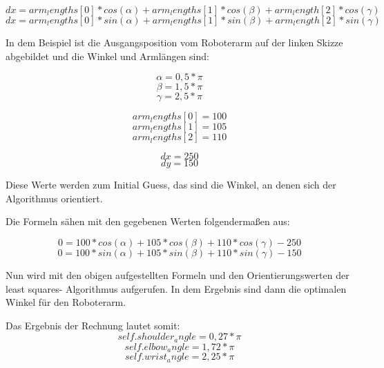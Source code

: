 \documentclass[12pt]{article}
\begin{document}
                    \[
                        dx = arm_lengths[0] * cos(\alpha) + arm_lengths[1] * cos(\beta) + arm_length[2] * cos(\gamma)
                    \]
                    \[
                        dx = arm_lengths[0] * sin(\alpha) + arm_lengths[1] * sin(\beta) + arm_length[2] * sin(\gamma)
                    \]

                    In dem Beispiel ist die Ausgangsposition vom Roboterarm auf der linken Skizze abgebildet und die
                    Winkel und Armlängen sind:

                    \[
                        \alpha = 0,5*\pi
                    \]
                    \[
                        \beta = 1,5 * \pi
                    \]
                    \[
                        \gamma = 2,5 * \pi
                    \]

                    \[
                        arm_lengths[0] = 100
                    \]
                    \[
                        arm_lengths[1] = 105
                    \]
                    \[
                        arm_lengths[2] = 110
                    \]

                    \[
                        dx = 250
                    \]
                    \[
                        dy = 150
                    \]

                    Diese Werte werden zum Initial Guess, das sind die Winkel, an denen sich der Algorithmus
                    orientiert.

                    Die Formeln sähen mit den gegebenen Werten folgendermaßen aus:

                    \[
                        0 = 100 * cos(\alpha) + 105 * cos(\beta) + 110 * cos(\gamma) -250
                    \]
                    \[
                        0 = 100 * sin(\alpha) + 105 * sin(\beta) + 110 * sin(\gamma) -150
                    \]

                    Nun wird mit den obigen aufgestellten Formeln und den Orientierungswerten der least squares-
                    Algorithmus aufgerufen. In dem Ergebnis sind dann die optimalen Winkel für den Roboterarm.

                    Das Ergebnis der Rechnung lautet somit:
                    \[
                        self.shoulder_angle = 0,27 *\pi
                    \]
                    \[
                        self.elbow_angle = 1,72 *\pi
                    \]
                    \[
                        self.wrist_angle = 2,25 *\pi
                    \]
\end{document}
